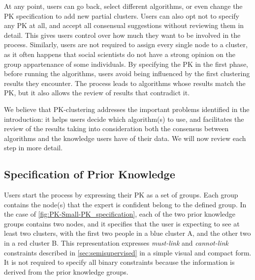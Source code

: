 At any point, users can go back, select different algorithms, or even change the PK specification to add new partial clusters.  Users can also opt not to specify any PK at all, and accept all consensual suggestions without reviewing them in detail. This gives users control over how much they want to be involved in the process. Similarly, users are not required to assign every single node to a cluster, as it often happens that social scientists do not have a strong opinion on the group appartenance of some individuals.
By specifying the PK in the first phase, before running the algorithms, users avoid being influenced by the first clustering results they encounter.  The process leads to algorithms whose results match the PK, but it also allows the review of results that contradict it.


We believe that PK-clustering addresses the important problems identified in the introduction: it helps users decide which algorithm(s) to use, and facilitates the review of the results taking into consideration both the consensus between algorithms and the knowledge users have of their data.
We will now review each step in more detail.




\subsection{Specification of Prior Knowledge}

Users start the process by expressing their PK as a set of groups. Each group contains the node(s) that the expert is confident belong to the defined group.
In the case of \autoref{fig:PK-Small-PK_specification}, each of the two prior knowledge groups contains two nodes, and it specifies that the user is expecting to see at least two clusters, with the first two people in a blue cluster A, and the other two in a red cluster B.
This representation expresses \emph{must-link} and \emph{cannot-link} constraints described in \autoref{sec:semisupervised} in a simple visual and compact form. It is not required to specify all binary constraints because the information is derived from the prior knowledge groups.

